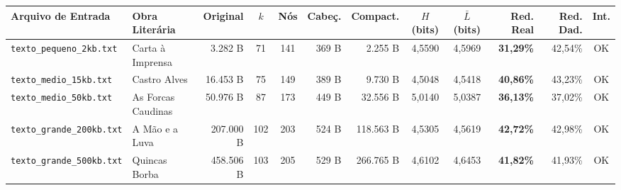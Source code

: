 \documentclass[a4paper,10pt]{article}
\begin{document}
\begin{table}[h!]
\centering
\scriptsize
\setlength{\tabcolsep}{1.8pt}
\begin{tabular}{|l|l|r|c|c|r|r|c|c|r|r|c|}
\hline
\textbf{Arquivo de Entrada} & \textbf{Obra Literária} & \textbf{Original} & \textbf{$k$} & \textbf{Nós} & \textbf{Cabeç.} & \textbf{Compact.} & \textbf{$H$ (bits)} & \textbf{$\bar{L}$ (bits)} & \textbf{Red. Real} & \textbf{Red. Dad.} & \textbf{Int.} \\
\hline
\texttt{texto\_pequeno\_2kb.txt}  & Carta à Imprensa  & 3.282 B   & 71  & 141 & 369 B & 2.255 B   & 4,5590 & 4,5969 & \textbf{31,29\%} & 42,54\% & OK \\
\texttt{texto\_medio\_15kb.txt}   & Castro Alves      & 16.453 B  & 75  & 149 & 389 B & 9.730 B   & 4,5048 & 4,5418 & \textbf{40,86\%} & 43,23\% & OK \\
\texttt{texto\_medio\_50kb.txt}   & As Forcas Caudinas& 50.976 B  & 87  & 173 & 449 B & 32.556 B  & 5,0140 & 5,0387 & \textbf{36,13\%} & 37,02\% & OK \\
\texttt{texto\_grande\_200kb.txt} & A Mão e a Luva    & 207.000 B & 102 & 203 & 524 B & 118.563 B & 4,5305 & 4,5619 & \textbf{42,72\%} & 42,98\% & OK \\
\texttt{texto\_grande\_500kb.txt} & Quincas Borba     & 458.506 B & 103 & 205 & 529 B & 266.765 B & 4,6102 & 4,6453 & \textbf{41,82\%} & 41,93\% & OK \\
\hline
\end{tabular}
\end{table}
\vspace{-3pt}
\end{document}
